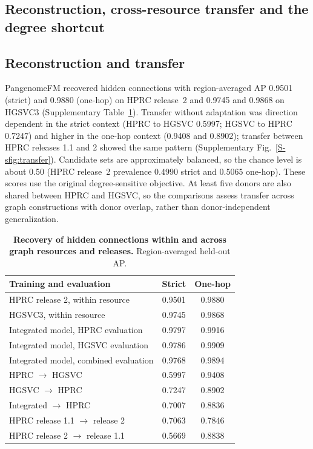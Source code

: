\documentclass[11pt]{article}
\newcommand{\method}{PangenomeFM\xspace}
\begin{document}
\begin{bibunit}[unsrtnat]
\section{Reconstruction, cross-resource transfer and the degree shortcut}
\label{S-snote:reconstruction}

\subsection{Reconstruction and transfer}
\method recovered hidden connections with region-averaged AP 0.9501 (strict) and 0.9880 (one-hop) on HPRC release~2 and 0.9745 and 0.9868 on HGSVC3 (Supplementary Table~\ref{S-stab:reconstruction}). Transfer without adaptation was direction dependent in the strict context (HPRC to HGSVC 0.5997; HGSVC to HPRC 0.7247) and higher in the one-hop context (0.9408 and 0.8902); transfer between HPRC releases 1.1 and 2 showed the same pattern (Supplementary Fig.~\ref{S-sfig:transfer}). Candidate sets are approximately balanced, so the chance level is about 0.50 (HPRC release~2 prevalence 0.4990 strict and 0.5065 one-hop). These scores use the original degree-sensitive objective. At least five donors are also shared between HPRC and HGSVC, so the comparisons assess transfer across graph constructions with donor overlap, rather than donor-independent generalization.

\begin{table}[H]
\centering
\caption{\textbf{Recovery of hidden connections within and across graph resources and releases.} Region-averaged held-out AP.}
\label{S-stab:reconstruction}
\small
\begin{tabular}{@{}lcc@{}}
\toprule
Training and evaluation & Strict & One-hop \\
\midrule
HPRC release 2, within resource & 0.9501 & 0.9880 \\
HGSVC3, within resource & 0.9745 & 0.9868 \\
Integrated model, HPRC evaluation & 0.9797 & 0.9916 \\
Integrated model, HGSVC evaluation & 0.9786 & 0.9909 \\
Integrated model, combined evaluation & 0.9768 & 0.9894 \\
\midrule
HPRC $\rightarrow$ HGSVC & 0.5997 & 0.9408 \\
HGSVC $\rightarrow$ HPRC & 0.7247 & 0.8902 \\
Integrated $\rightarrow$ HPRC & 0.7007 & 0.8836 \\
HPRC release 1.1 $\rightarrow$ release 2 & 0.7063 & 0.7846 \\
HPRC release 2 $\rightarrow$ release 1.1 & 0.5669 & 0.8838 \\
\bottomrule
\end{tabular}
\end{table}


\end{bibunit}
\end{document}
